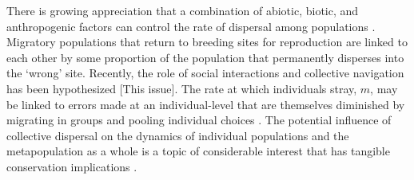 \documentclass[twocolumn,preprintnumbers,amsmath,amssymb,superscriptaddress]{revtex4}
\begin{document}
There is growing appreciation that a combination of abiotic, biotic, and anthropogenic factors can control the rate of dispersal among populations \cite{H:2013fs,Keefer:2014gg,Bett:2017ha}.
Migratory populations that return to breeding sites for reproduction are linked to each other by some proportion of the population that permanently disperses into the `wrong' site. 
Recently, the role of social interactions and collective navigation has been hypothesized [This issue].
The rate at which individuals stray, $m$, may be linked to errors made at an individual-level that are themselves diminished by migrating in groups and pooling individual choices \cite{Simons:2004jo,Berdahl:2015kv,Berdahl:2016dx}.
The potential influence of collective dispersal on the dynamics of individual populations and the metapopulation as a whole is a topic of considerable interest that has tangible conservation implications \cite{Brenner:2012gl,Johnson:2012fe,Fullerton:2011ii}.



\end{document}
